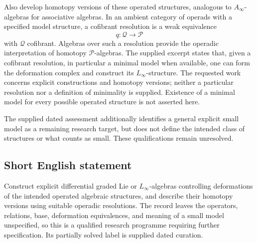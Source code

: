 \documentclass[11pt]{article}
\begin{document}
Also develop homotopy versions of these operated structures, analogous to \(A_\infty\)-algebras for associative algebras. In an ambient category of operads with a specified model structure, a cofibrant resolution is a weak equivalence
\[
q\colon\mathcal Q\longrightarrow\mathcal P
\]
with \(\mathcal Q\) cofibrant. Algebras over such a resolution provide the operadic interpretation of homotopy \(\mathcal P\)-algebras. The supplied excerpt states that, given a cofibrant resolution, in particular a minimal model when available, one can form the deformation complex and construct its \(L_\infty\)-structure. The requested work concerns explicit constructions and homotopy versions; neither a particular resolution nor a definition of minimality is supplied. Existence of a minimal model for every possible operated structure is not asserted here.

The supplied dated assessment additionally identifies a general explicit small model as a remaining research target, but does not define the intended class of structures or what counts as small. These qualifications remain unresolved.
\subsection{Short English statement}
Construct explicit differential graded Lie or \(L_\infty\)-algebras controlling deformations of the intended operated algebraic structures, and describe their homotopy versions using suitable operadic resolutions. The record leaves the operators, relations, base, deformation equivalences, and meaning of a small model unspecified, so this is a qualified research programme requiring further specification. Its partially solved label is supplied dated curation.
\end{document}
